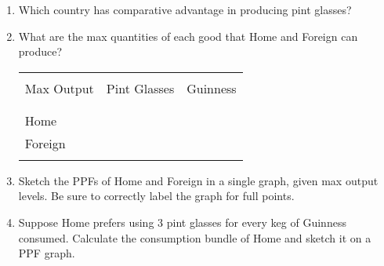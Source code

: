 \documentclass[12pt]{article}
\begin{document}
\begin{enumerate}[1)]
	
	\item Which country has comparative advantage in producing pint glasses?
	
	\newpage
	
	\item What are the max quantities of each good that Home and Foreign can produce?
	
	\vspace{2.0in}
	
	\begin{table}[!h]
		\centering
		\begin{tabular}[t]{l c c }
			\hline
			&&\\
			Max Output & Pint Glasses & Guinness  \\
			&&\\
			\hline
			&&\\
			Home &  &   \\
			Foreign &  &  \\
			&&\\
			\hline
		\end{tabular}
	\end{table}
	
	\item Sketch the PPFs of Home and Foreign in a single graph, given max output levels. Be sure to correctly label the graph for full points. 
	
	\bigskip
	
	\bigskip
	
	\bigskip
	
	\bigskip
	
	\newpage
	
	\item Suppose Home prefers using 3 pint glasses for every keg of Guinness consumed. Calculate the consumption bundle of Home and sketch it on a PPF graph.
	
	\bigskip
	
	\bigskip
	
	\bigskip
	
	\bigskip
	
	\bigskip
	
	\bigskip
	
	\bigskip
	
	\bigskip
	
	\bigskip
	
	\bigskip
	
	\bigskip
	
	\bigskip
	

\end{enumerate}
\end{document}
